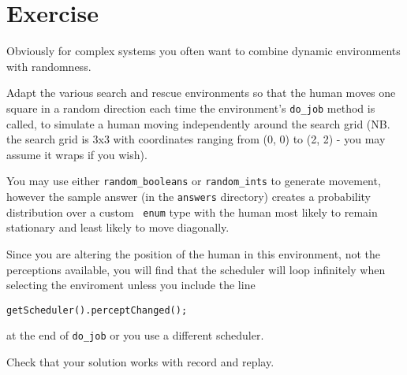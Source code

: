 \section{Exercise}

Obviously for complex systems you often want to combine dynamic environments with randomness.  

Adapt the various search and rescue environments so that the human moves one square in a random direction each time the environment's \texttt{do\_job} method is called, to simulate a human moving independently around the search grid (NB. the search grid is 3x3 with coordinates ranging from (0, 0) to (2, 2) - you may assume it wraps if you wish).  

You may use either \texttt{random\_booleans} or \texttt{random\_ints} to generate movement, however the sample answer (in the \texttt{answers} directory) creates a probability distribution over a custom \java\ \texttt{enum} type with the human most likely to remain stationary and least likely to move diagonally.

Since you are altering the position of the human in this environment, not the perceptions available, you will find that the scheduler will loop infinitely when selecting the enviroment unless you include the line
\begin{verbatim}
getScheduler().perceptChanged();
\end{verbatim}
at the end of \texttt{do\_job} or you use a different scheduler.

Check that your solution works with record and replay.
